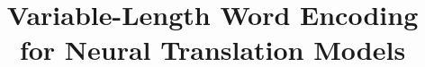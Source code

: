 \documentclass[11pt]{article}
\title{Variable-Length Word Encoding for Neural Translation Models}
\begin{document}
\maketitle
\begin{abstract}

\end{abstract}







\newpage

\end{document}
